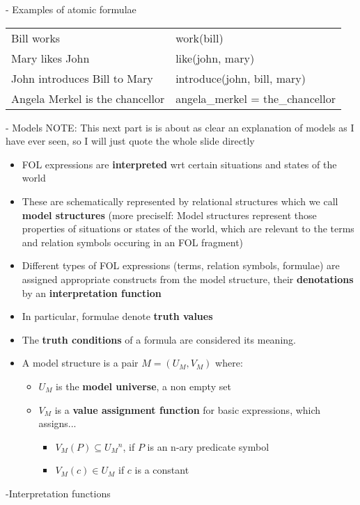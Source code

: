 \documentclass[11pt]{article}
\begin{document}
- Examples of atomic formulae
\begin{center}
\begin{tabular}{ll}
Bill works & work(bill)\\
Mary likes John & like(john, mary)\\
John introduces Bill to Mary & introduce(john, bill, mary)\\
Angela Merkel is the chancellor & angela\_merkel = the\_chancellor
\end{tabular}
\end{center}
- Models 
NOTE: This next part is is about as clear an explanation of models as I have ever seen, so I will just quote the whole slide directly 
\begin{itemize}
 \item FOL expressions are {\bf interpreted} wrt certain situations and states of the world
 \item These are schematically represented by relational structures which we call {\bf model structures} (more preciself: Model structures represent those properties of situations or states of the world, which are relevant to the terms and relation symbols occuring in an FOL fragment)
 \item Different types of FOL expressions (terms, relation symbols, formulae) are assigned appropriate constructs from the model structure, their {\bf denotations} by an {\bf interpretation function}
 \item In particular, formulae denote {\bf truth values}
 \item The {\bf truth conditions} of a formula are considered its meaning.
 \item A model structure is a pair $M = (U_M , V_M)$ where:
\begin{itemize}
 \item $U_M$ is the {\bf model universe}, a non empty set
 \item $V_M$ is a {\bf value assignment function} for basic expressions, which assigns...
\begin{itemize}
 \item $V_M (P) \subseteq U{_M}^n$, if $P$ is an n-ary predicate symbol
 \item $V_M (c) \in U_M$ if $c$ is a constant
\end{itemize} 
\end{itemize}
\end{itemize}
-Interpretation functions
\end{document}
